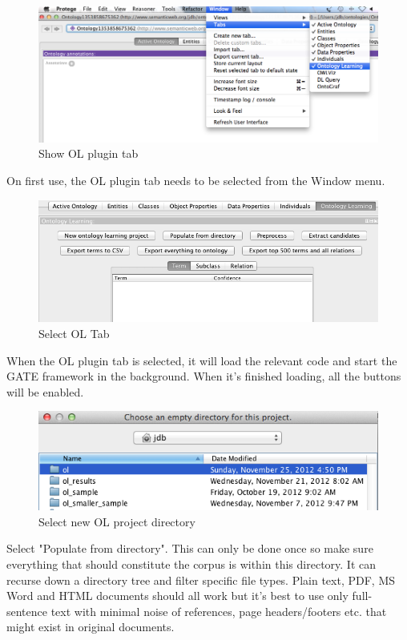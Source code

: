 \documentclass[a4paper]{report}
\begin{document}
\begin{figure}[H]
  \centering
  \includegraphics[width=\textwidth]{graphics/2._Show_OL_plugin_tab.png}
  \caption{Show OL plugin tab}
  \label{fig:walkthrough2}
\end{figure}
On first use, the OL plugin tab needs to be selected from the Window menu. 

\begin{figure}[H]
  \centering
  \includegraphics[width=.8\textwidth]{graphics/3._Select_OL_Tab.png}
  \caption{Select OL Tab}
  \label{fig:walkthrough3}
\end{figure}
When the OL plugin tab is selected, it will load the relevant code and start the GATE framework in the background.
When it's finished loading, all the buttons will be enabled. 

\begin{figure}[H]
  \centering
  \includegraphics[width=.6\textwidth]{graphics/4._Select_new_OL_project_directory.png}
  \caption{Select new OL project directory}
  \label{fig:walkthrough4}
\end{figure}
Select "Populate from directory".
This can only be done once so make sure everything that should constitute the corpus is within this directory.
It can recurse down a directory tree and filter specific file types.
Plain text, PDF, MS Word and HTML documents should all work but it's best to use only full-sentence text with minimal noise of references, page headers/footers etc. that might exist in original documents. 
\end{document}
